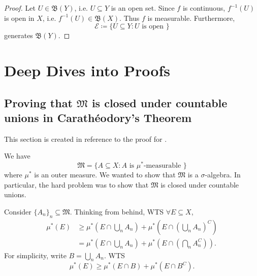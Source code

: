 \documentclass[notoc,notitlepage]{tufte-book}
\begin{document}
\begin{proof}
  Let $U \in \mathfrak{B}(Y)$, i.e. $U \subseteq Y$ is an open set.
  Since $f$ is continuous, $f^{-1}(U)$ is open in $X$,
  i.e. $f^{-1}(U) \in \mathfrak{B}(X)$.
  Thus $f$ is measurable.
  Furthermore,
  \begin{equation*}
    \mathcal{E} \coloneqq \{ U \subseteq Y : U \text{ is open } \}
  \end{equation*}
  generates $\mathfrak{B}(Y)$.
\end{proof}



\appendix

\chapter{Deep Dives into Proofs}%
\label{chp:deep_dives_into_proofs}

\section{Proving that \texorpdfstring{$\mathfrak{M}$}{M} is closed under countable unions in Carath\'{e}odory's Theorem}\label{sec:proving_that_m_is_closed_under_countable_unions_in_caratheodory_s_theorem}

This section is created in reference to
the proof for .

We have
\begin{equation*}
  \mathfrak{M} = \{ A \subseteq X : A \text{ is } \mu^*\text{-measurable } \}
\end{equation*}
where $\mu^*$ is an outer measure.
We wanted to show that $\mathfrak{M}$ is a $\sigma$-algebra.
In particular, the hard problem was to show that
$\mathfrak{M}$ is closed under countable unions.

Consider $\{ A_n \}_{n} \subseteq \mathfrak{M}$.
Thinking from behind, WTS $\forall E \subseteq X$,
\begin{align*}
  \mu^*(E)
  &\geq \mu^* \left( E \cap \bigcup_{n} A_n \right)
    + \mu^* \left( E \cap \left( \bigcup_{n} A_n \right)^C \right) \\
  &= \mu^* \left( E \cap \bigcup_{n} A_n \right)
    + \mu^* \left( E \cap \left( \bigcap_{n} A_n^C \right) \right).
\end{align*}
For simplicity, write $B = \bigcup_{n} A_n$.
WTS
\begin{equation}\tag{$*$}\label{eq:appendix_1_eq_1}
  \mu^*(E) \geq \mu^*(E \cap B) + \mu^*(E \cap B^C).
\end{equation}
\end{document}
